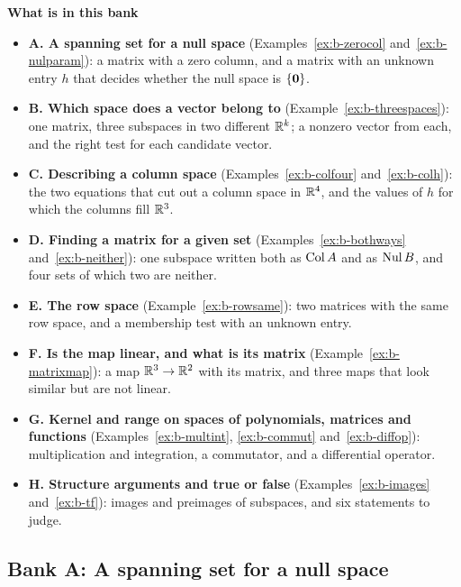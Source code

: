 \documentclass[11pt]{article}
\begin{document}
\textbf{What is in this bank}
\begin{itemize}
  \item \textbf{A. A spanning set for a null space} (Examples~\ref{ex:b-zerocol} and~\ref{ex:b-nulparam}): a matrix with a zero column, and a matrix with an unknown entry $h$ that decides whether the null space is $\{\mathbf{0}\}$.
  \item \textbf{B. Which space does a vector belong to} (Example~\ref{ex:b-threespaces}): one matrix, three subspaces in two different $\mathbb{R}^k$; a nonzero vector from each, and the right test for each candidate vector.
  \item \textbf{C. Describing a column space} (Examples~\ref{ex:b-colfour} and~\ref{ex:b-colh}): the two equations that cut out a column space in $\mathbb{R}^4$, and the values of $h$ for which the columns fill $\mathbb{R}^3$.
  \item \textbf{D. Finding a matrix for a given set} (Examples~\ref{ex:b-bothways} and~\ref{ex:b-neither}): one subspace written both as $\operatorname{Col} A$ and as $\operatorname{Nul} B$, and four sets of which two are neither.
  \item \textbf{E. The row space} (Example~\ref{ex:b-rowsame}): two matrices with the same row space, and a membership test with an unknown entry.
  \item \textbf{F. Is the map linear, and what is its matrix} (Example~\ref{ex:b-matrixmap}): a map $\mathbb{R}^3\to\mathbb{R}^2$ with its matrix, and three maps that look similar but are not linear.
  \item \textbf{G. Kernel and range on spaces of polynomials, matrices and functions} (Examples~\ref{ex:b-multint}, \ref{ex:b-commut} and~\ref{ex:b-diffop}): multiplication and integration, a commutator, and a differential operator.
  \item \textbf{H. Structure arguments and true or false} (Examples~\ref{ex:b-images} and~\ref{ex:b-tf}): images and preimages of subspaces, and six statements to judge.
\end{itemize}

\subsection*{Bank A: A spanning set for a null space}
\end{document}
